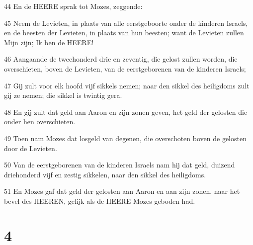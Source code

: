 \par 44 En de HEERE sprak tot Mozes, zeggende:
\par 45 Neem de Levieten, in plaats van alle eerstgeboorte onder de kinderen Israels, en de beesten der Levieten, in plaats van hun beesten; want de Levieten zullen Mijn zijn; Ik ben de HEERE!
\par 46 Aangaande de tweehonderd drie en zeventig, die gelost zullen worden, die overschieten, boven de Levieten, van de eerstgeborenen van de kinderen Israels;
\par 47 Gij zult voor elk hoofd vijf sikkels nemen; naar den sikkel des heiligdoms zult gij ze nemen; die sikkel is twintig gera.
\par 48 En gij zult dat geld aan Aaron en zijn zonen geven, het geld der gelosten die onder hen overschieten.
\par 49 Toen nam Mozes dat losgeld van degenen, die overschoten boven de gelosten door de Levieten.
\par 50 Van de eerstgeborenen van de kinderen Israels nam hij dat geld, duizend driehonderd vijf en zestig sikkelen, naar den sikkel des heiligdoms.
\par 51 En Mozes gaf dat geld der gelosten aan Aaron en aan zijn zonen, naar het bevel des HEEREN, gelijk als de HEERE Mozes geboden had.

\chapter{4}

